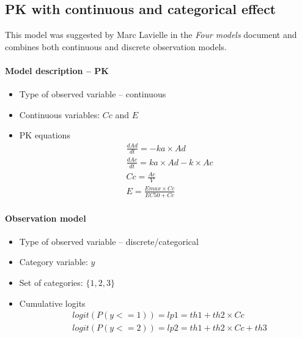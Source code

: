 

\subsection{PK with continuous and categorical effect}
\label{subsec:PKPDcategorical2}
This model was suggested by Marc Lavielle in the \emph{Four models} document and combines 
both continuous and discrete observation models.


\paragraph{Model description -- PK}

\begin{itemize}
\item
Type of observed variable -- continuous
\item
Continuous variables: $Cc$ and $E$
\item
PK equations
\begin{align}
& \frac{dAd}{dt} = -ka \times Ad  \nonumber \\
& \frac{dAc}{dt} = ka \times Ad - k \times Ac  \nonumber \\
& Cc = \frac{Ac}{V}  \nonumber \\
& E = \frac{Emax \times Cc}{EC50 + Cc}  \nonumber
\end{align}
\end{itemize}


\paragraph{Observation model}

\begin{itemize}
\item
Type of observed variable -- discrete/categorical
\item
Category variable: $y$
\item
Set of categories: $\{1,2,3\}$
\item
Cumulative logits
\begin{align}
& logit(P(y<=1) )= lp1 = th1 + th2 \times Cc  \nonumber \\
& logit(P(y<=2) )= lp2 = th1 + th2 \times Cc + th3 \nonumber 
\end{align}
\end{itemize}

